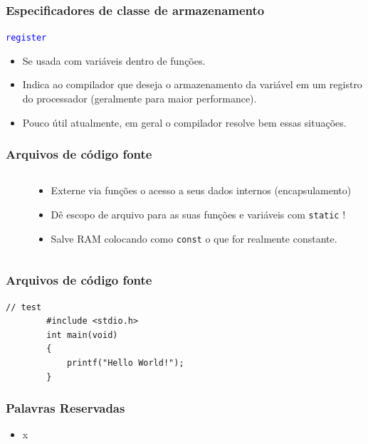 \documentclass{beamer}
\begin{document}
\begin{frame}
	\frametitle{Especificadores de classe de armazenamento}
	\begin{center}
		\texttt{\textcolor{blue}{register}}
	\end{center}
	\vspace*{0.5cm}
	\begin{itemize}
		\item Se usada com variáveis dentro de funções.
		\item Indica ao compilador que deseja o armazenamento da variável em um registro do processador (geralmente para maior performance).
		\item Pouco útil atualmente, em geral o compilador resolve bem essas situações.
	\end{itemize}
\end{frame}

\begin{frame}
	\frametitle{Arquivos de código fonte}
	\begin{columns}[T] %
		\begin{column}{.60\textwidth}
			
		\end{column}%
		\hfill%
		\begin{column}{.40\textwidth}
			\begin{itemize}
				\item Externe via funções o acesso a seus dados internos (encapsulamento)
				\item Dê escopo de arquivo para as suas funções e variáveis com \texttt{static} !
				\item Salve RAM colocando como \texttt{const} o que for realmente constante.
			\end{itemize}
		\end{column}%
	\end{columns}
\end{frame}

\begin{frame}
	\frametitle{Arquivos de código fonte}
	
\end{frame}


\begin{frame}[fragile]
	\begin{lstlisting}[style=customc]
		// test
		#include <stdio.h>
		int main(void)
		{
			printf("Hello World!"); 
		}
	\end{lstlisting}
\end{frame}

\begin{frame}
	\frametitle{Palavras Reservadas}
	\begin{itemize}
		\item x
	\end{itemize}	
\end{frame}
\end{document}
